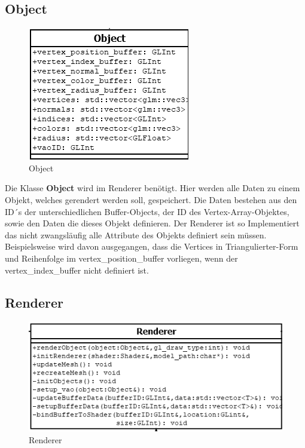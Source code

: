 \subsection{Object}

	\begin{figure}[H]
	\centering
	\includegraphics[width=0.7\linewidth]{object.png}
	\caption{Object}
	\label{fig5}
	\end{figure}

\noindent Die Klasse \textbf{Object} wird im Renderer benötigt. Hier werden alle Daten zu einem Objekt, welches gerendert werden soll, gespeichert. Die Daten bestehen aus den ID´s der unterschiedlichen Buffer-Objects, der ID des Vertex-Array-Objektes, sowie den Daten die dieses Objekt definieren. Der Renderer ist so Implementiert das nicht zwangsläufig alle Attribute des Objekts definiert sein müssen. Beispielsweise wird davon ausgegangen, dass die Vertices in Triangulierter-Form und Reihenfolge im vertex\_position\_buffer vorliegen, wenn der vertex\_index\_buffer nicht definiert ist.


\subsection{Renderer}


	\begin{figure}[H]
	\centering
	\includegraphics[width=0.7\linewidth]{renderer.png}
	\caption{Renderer}
	\label{fig6}
	\end{figure}

